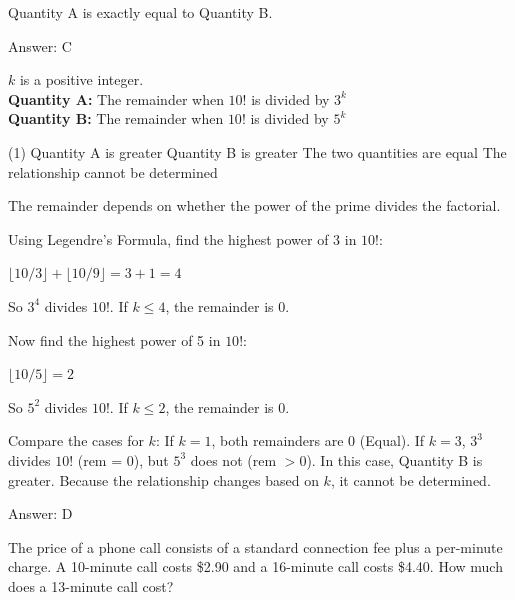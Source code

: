 \documentclass[11pt,paper=a4,answers]{exam}
\begin{document}
\begin{questions}
\begin{solution}
Quantity A is exactly equal to Quantity B.

Answer: \colorbox{yellow!100}{C}
\end{solution}

\vspace{1cm}

\question
$k$ is a positive integer.
\\[0.3cm]
\textbf{Quantity A: } The remainder when $10!$ is divided by $3^k$ \\
\textbf{Quantity B: } The remainder when $10!$ is divided by $5^k$

\begin{tasks}(1)
\task[A)] Quantity A is greater
\task[B)] Quantity B is greater
\task[C)] The two quantities are equal
\task[D)] The relationship cannot be determined
\end{tasks}

\begin{solution}
The remainder depends on whether the power of the prime divides the factorial.
\vspace{5pt}

Using Legendre's Formula, find the highest power of 3 in $10!$:
\begin{center}
$\lfloor 10/3 \rfloor + \lfloor 10/9 \rfloor = 3 + 1 = 4$
\end{center}
So $3^4$ divides $10!$. If $k \leq 4$, the remainder is 0.
\vspace{5pt}

Now find the highest power of 5 in $10!$:
\begin{center}
$\lfloor 10/5 \rfloor = 2$
\end{center}
So $5^2$ divides $10!$. If $k \leq 2$, the remainder is 0.
\vspace{5pt}

Compare the cases for $k$:
If $k=1$, both remainders are 0 (Equal).
If $k=3$, $3^3$ divides $10!$ (rem = 0), but $5^3$ does not (rem $> 0$). 
In this case, Quantity B is greater.
\vspace{5pt}
Because the relationship changes based on $k$, it cannot be determined.

Answer: \colorbox{yellow!100}{D}
\end{solution}

\vspace{1cm}


\question
The price of a phone call consists of a standard connection fee plus a per-minute charge. A 10-minute call costs \$2.90 and a 16-minute call costs \$4.40. How much does a 13-minute call cost?


\end{questions}
\end{document}

